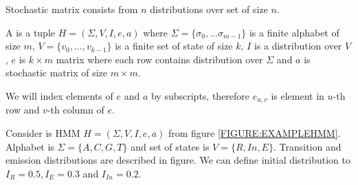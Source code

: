 \begin{note}
Stochastic matrix consists from $n$ distributions over set of size $n$.
\end{note}

\begin{definition}\label{DEF:HMM}
A  is a tuple $H=(\Sigma,V,I,e,a)$ where
$\Sigma=\{\sigma_0,\dots\sigma_{m-1}\}$ is a finite alphabet of size $m$,
$V=\{v_0,\dots,v_{k-1}\}$ is a finite set of state of size $k$, $I$ is
a distribution over $V$, $e$ is $k\times m$ matrix where each row contains
distribution over $\Sigma$ and $a$ is stochastic matrix of size $m\times m$.

We will index elements of $e$ and $a$ by subscripts, therefore $e_{u,v}$ is
element in $u$-th row and $v$-th column of $e$.  

\end{definition}

\begin{example} Consider is HMM $H=(\Sigma,V,I,e,a)$ from figure
\ref{FIGURE:EXAMPLEHMM}.  Alphabet is $\Sigma=\{A,C,G,T\}$ and set of states is
$V=\{R,In,E\}$.  Transition and emission distributions are described in figure.
We can define initial distribution to $I_R=0.5, I_E=0.3$ and $I_{In}=0.2$.

\end{example}

